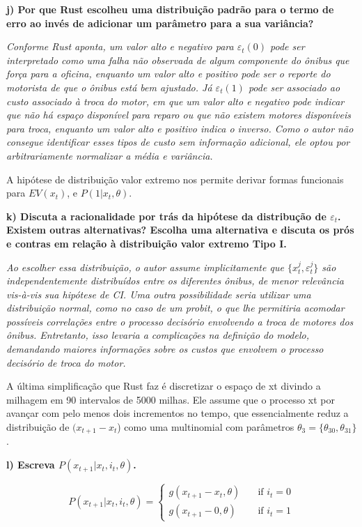 \documentclass[12pt,a4paper]{article}
\begin{document}
\textbf{j) Por que Rust escolheu uma distribuição padrão para o termo de
erro ao invés de adicionar um parâmetro para a sua variância?}

\emph{Conforme Rust aponta, um valor alto e negativo para
\(\varepsilon_t(0)\) pode ser interpretado como uma falha não observada
de algum componente do ônibus que força para a oficina, enquanto um
valor alto e positivo pode ser o reporte do motorista de que o ônibus
está bem ajustado. Já \(\varepsilon_t(1)\) pode ser associado ao custo
associado à troca do motor, em que um valor alto e negativo pode indicar
que não há espaço disponível para reparo ou que não existem motores
disponíveis para troca, enquanto um valor alto e positivo indica o
inverso. Como o autor não consegue identificar esses tipos de custo sem
informação adicional, ele optou por arbitrariamente normalizar a média e
variância.}

A hipótese de distribuição valor extremo nos permite derivar formas
funcionais para \(EV(x_t)\), e \(P(1 | x_t, \theta)\).

\textbf{k) Discuta a racionalidade por trás da hipótese da distribução
de \(\varepsilon_t\). Existem outras alternativas? Escolha uma
alternativa e discuta os prós e contras em relação à distribuição valor
extremo Tipo I.}

\emph{Ao escolher essa distribuição, o autor assume implicitamente que
\(\{x_t^j,\varepsilon_t^j\}\) são independentemente distribuídos entre
os diferentes ônibus, de menor relevância vis-à-vis sua hipótese de CI.
Uma outra possibilidade seria utilizar uma distribuição normal, como no
caso de um probit, o que lhe permitiria acomodar possíveis correlações
entre o processo decisório envolvendo a troca de motores dos ônibus.
Entretanto, isso levaria a complicações na definição do modelo,
demandando maiores informações sobre os custos que envolvem o processo
decisório de troca do motor.}

A última simplificação que Rust faz é discretizar o espaço de xt divindo
a milhagem em 90 intervalos de 5000 milhas. Ele assume que o processo xt
por avançar com pelo menos dois incrementos no tempo, que essencialmente
reduz a distribuição de \((x_{t+1} - x_t\)) como uma multinomial com
parâmetros \(\theta_3 = \{\theta_{30}, \theta_{31}\}\).

\textbf{l) Escreva \(P (x_{t+1}| x_t, i_t, \theta)\).}

\[
P (x_{t+1}| x_t, i_t, \theta) =
\begin{cases}
  g(x_{t+1} - x_t,\theta) & \quad \text{if } i_t=0 \\
  g(x_{t+1} - 0,\theta) & \quad \text{if } i_t=1
\end{cases}
\]
\end{document}
